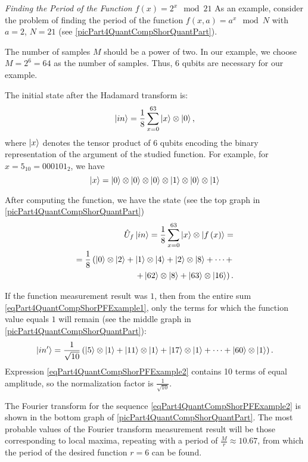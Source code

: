 \begin{example}
\emph{Finding the Period of the Function $f\left(x\right) = 2^x \mod 21$}
\label{exPart4QuantCompShorQuantPeriodFinding}
As an example, consider the problem of finding the period of the function $f\left(x, a\right) = a^x \mod{N}$ with $a=2$, $N = 21$ (see \autoref{picPart4QuantCompShorQuantPart}).

The number of samples $M$ should be a power of two. In our example, we choose $M = 2^6 = 64$ as the number of samples. Thus, 6 qubits are necessary for our example.

The initial state after the Hadamard transform is:
\begin{equation}
\ket{in} = \frac{1}{8}\sum_{x = 0}^{63}\ket{x} \otimes \ket{0},
\nonumber
\end{equation}
where $\ket{x}$ denotes the tensor product of 6 qubits encoding the binary representation of the argument of the studied function. For example, for $x=5_{10}=000101_2$, we have
\[
\ket{x} = \ket{0}\otimes \ket{0}\otimes \ket{0}\otimes \ket{1}\otimes \ket{0}\otimes \ket{1}
\]

After computing the function, we have the state (see the top graph in \autoref{picPart4QuantCompShorQuantPart})
\begin{eqnarray}
\hat{U}_f\ket{in} = \frac{1}{8}\sum_{x = 0}^{63}\ket{x} \otimes \left|f\left(x\right)\right> = 
\nonumber \\
=
\frac{1}{8}
\left(
\ket{0}\otimes\ket{2} + 
\ket{1}\otimes\ket{4} + 
\ket{2}\otimes\ket{8} + \dots +
\right.
\nonumber \\
\left.
+
\ket{62}\otimes\ket{8} +
\ket{63}\otimes\ket{16}
\right).
\label{eqPart4QuantCompShorPFExample1}
\end{eqnarray}

If the function measurement result was $1$, then from the entire sum \eqref{eqPart4QuantCompShorPFExample1}, only the terms for which the function value equals $1$ will remain (see the middle graph in \autoref{picPart4QuantCompShorQuantPart}):
\begin{equation}
\ket{in'} = \frac{1}{\sqrt{10}}\left( 
\ket{5}\otimes\ket{1} +
\ket{11}\otimes\ket{1} +
\ket{17}\otimes\ket{1} +
\dots +
\ket{60}\otimes\ket{1}
\right).
\label{eqPart4QuantCompShorPFExample2}
\end{equation} 
Expression \eqref{eqPart4QuantCompShorPFExample2} contains 10 terms of equal amplitude, so the normalization factor is $\frac{1}{\sqrt{10}}$.

The Fourier transform for the sequence \eqref{eqPart4QuantCompShorPFExample2} is shown in the bottom graph of \autoref{picPart4QuantCompShorQuantPart}. The most probable values of the Fourier transform measurement result will be those corresponding to local maxima, repeating with a period of $\frac{M}{r}\approx10.67$, from which the period of the desired function $r=6$ can be found.

\end{example}